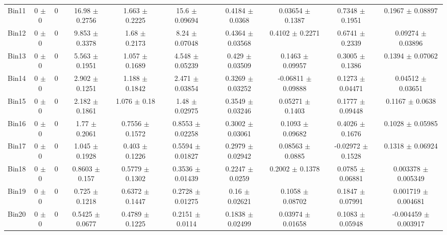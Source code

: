 \begin{tabular}{@{\extracolsep{4pt}}lccccccccc@{}}
     Bin11 & 0 $\pm$ 0 & 0 & 16.98 $\pm$ 0.2756 & 1.663 $\pm$ 0.2225 & 15.6 $\pm$ 0.09694 & 0.4184 $\pm$ 0.0368 & 0.03654 $\pm$ 0.1387 & 0.7348 $\pm$ 0.1951 & 0.1967 $\pm$ 0.08897 \\ 
     Bin12 & 0 $\pm$ 0 & 0 & 9.853 $\pm$ 0.3378 & 1.68 $\pm$ 0.2173 & 8.24 $\pm$ 0.07048 & 0.4364 $\pm$ 0.03568 & 0.4102 $\pm$ 0.2271 & 0.6741 $\pm$ 0.2339 & 0.09274 $\pm$ 0.03896 \\ 
     Bin13 & 0 $\pm$ 0 & 0 & 5.563 $\pm$ 0.1951 & 1.057 $\pm$ 0.1689 & 4.548 $\pm$ 0.05239 & 0.429 $\pm$ 0.03509 & 0.1463 $\pm$ 0.09957 & 0.3005 $\pm$ 0.1386 & 0.1394 $\pm$ 0.07062 \\ 
     Bin14 & 0 $\pm$ 0 & 0 & 2.902 $\pm$ 0.1251 & 1.188 $\pm$ 0.1842 & 2.471 $\pm$ 0.03854 & 0.3269 $\pm$ 0.03252 & -0.06811 $\pm$ 0.09888 & 0.1273 $\pm$ 0.04471 & 0.04512 $\pm$ 0.03651 \\ 
     Bin15 & 0 $\pm$ 0 & 0 & 2.182 $\pm$ 0.1861 & 1.076 $\pm$ 0.18 & 1.48 $\pm$ 0.02975 & 0.3549 $\pm$ 0.03246 & 0.05271 $\pm$ 0.1403 & 0.1777 $\pm$ 0.09448 & 0.1167 $\pm$ 0.0638 \\ 
     Bin16 & 0 $\pm$ 0 & 0 & 1.77 $\pm$ 0.2061 & 0.7556 $\pm$ 0.1572 & 0.8553 $\pm$ 0.02258 & 0.3002 $\pm$ 0.03061 & 0.1093 $\pm$ 0.09682 & 0.4026 $\pm$ 0.1676 & 0.1028 $\pm$ 0.05985 \\ 
     Bin17 & 0 $\pm$ 0 & 0 & 1.045 $\pm$ 0.1928 & 0.403 $\pm$ 0.1226 & 0.5594 $\pm$ 0.01827 & 0.2979 $\pm$ 0.02942 & 0.08563 $\pm$ 0.0885 & -0.02972 $\pm$ 0.1528 & 0.1318 $\pm$ 0.06924 \\ 
     Bin18 & 0 $\pm$ 0 & 0 & 0.8603 $\pm$ 0.157 & 0.5779 $\pm$ 0.1302 & 0.3536 $\pm$ 0.01439 & 0.2247 $\pm$ 0.0259 & 0.2002 $\pm$ 0.1378 & 0.0785 $\pm$ 0.06881 & 0.003378 $\pm$ 0.005349 \\ 
     Bin19 & 0 $\pm$ 0 & 0 & 0.725 $\pm$ 0.1218 & 0.6372 $\pm$ 0.1447 & 0.2728 $\pm$ 0.01275 & 0.16 $\pm$ 0.02621 & 0.1058 $\pm$ 0.08702 & 0.1847 $\pm$ 0.07991 & 0.001719 $\pm$ 0.004681 \\ 
     Bin20 & 0 $\pm$ 0 & 0 & 0.5425 $\pm$ 0.0677 & 0.4789 $\pm$ 0.1225 & 0.2151 $\pm$ 0.0114 & 0.1838 $\pm$ 0.02499 & 0.03974 $\pm$ 0.01658 & 0.1083 $\pm$ 0.05948 & -0.004459 $\pm$ 0.003917 \\ 
\hline\hline
  \end{tabular}
